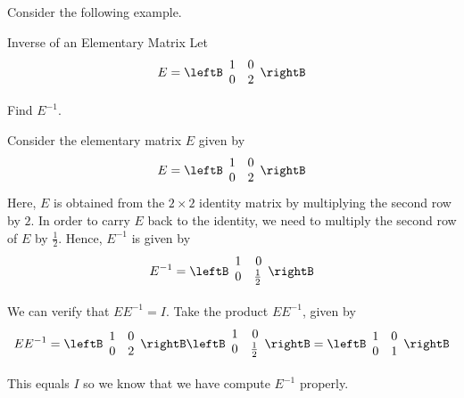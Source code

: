Consider the following example.

\begin{example}{Inverse of an Elementary Matrix}\label{exa:inverseelemmatrix}
Let 
\begin{equation*}
E
=
\leftB
\begin{array}{rr}
1 & 0 \\
0 & 2
\end{array}
\rightB
\end{equation*}

Find $E^{-1}$. 
\end{example}

\begin{solution}
Consider the elementary matrix $E$ given by 
\begin{equation*}
E
=
\leftB
\begin{array}{rr}
1 & 0 \\
0 & 2
\end{array}
\rightB
\end{equation*}
Here, $E$ is obtained from the $2 \times 2$ identity matrix by multiplying the second row by $2$. In order to carry $E$ back to the identity,
we need to multiply the second row of $E$ by $\frac{1}{2}$. 
Hence, $E^{-1}$ is given by
\begin{equation*}
E^{-1}
=
\leftB
\begin{array}{rr}
1 & 0 \\
0 & \vspace{0.05in}\frac{1}{2}
\end{array}
\rightB
\end{equation*}

We can verify that $EE^{-1}=I$. Take the product $EE^{-1}$, given by
\begin{equation*}
EE^{-1}
=
\leftB
\begin{array}{rr}
1 & 0 \\
0 & 2
\end{array}
\rightB
\leftB
\begin{array}{rr}
1 & 0 \\
0 & \vspace{0.05in}\frac{1}{2}
\end{array}
\rightB
=
\leftB
\begin{array}{rr}
1 & 0 \\
0 & 1
\end{array}
\rightB
\end{equation*}

This equals $I$ so we know that we have compute $E^{-1}$ properly. 
\end{solution}

